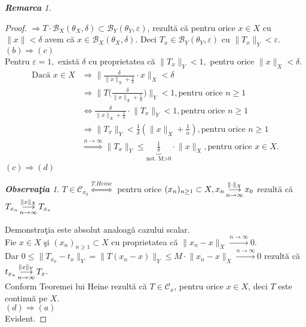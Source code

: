\documentclass[ a4paper, 12pt]{report}
\theoremstyle{definition}
\theoremstyle{remark}
\newtheorem{remarc}{\bf Remarca}[section]
\newtheorem{obs}{\bf Observa\c tia }[section]
\numberwithin{equation}{section}
\begin{document}
\begin{remarc}
\begin{proof}
$\Rightarrow T \cdot \mathcal{B}_{X}(\theta_{X}, \delta) \subset \mathcal{B}_{Y}(\theta_{Y}, \varepsilon)$, rezult\u a c\u a pentru orice $x \in X$ cu $\lVert x \rVert < \delta$ avem c\u a $x \in \mathcal{B}_{X}(\theta_{X}, \delta)$. Deci $T_{x} \in \mathcal{B}_{Y}(\theta_{Y}, \varepsilon)$ cu $\lVert T_{x} \rVert_{Y}< \varepsilon.$\\
$(b) \Longrightarrow (c)$\\
Pentru $\varepsilon =1,$ exist\u a $\delta$ cu proprietatea c\u a $\lVert T_x \rVert_{Y}<1,$ pentru orice $\lVert x \rVert_{X} < \delta.$\\
\begin{align*}
\mbox{Dac\u a } x \in X &\Rightarrow \lVert \frac{\delta}{\lVert x \rVert_{X}+\frac{1}{n}}\cdot x \rVert_{X} < \delta \\&\Rightarrow \lVert T \Big(  \frac{\delta}{\lVert x \rVert_{X}+\frac{1}{n}} \Big) \rVert_{Y} < 1, \mbox{pentru orice } n \geq 1 \\&\Leftrightarrow \frac{\delta}{\lVert x \rVert_{X}+\frac{1}{n}} \cdot \lVert T_x \rVert_{Y} < 1, \mbox{pentru orice } n \geq 1 \\&\Rightarrow \lVert T_x \rVert_{Y} < \frac{1}{\delta} \left( \lVert x \rVert_{X} + \frac{1}{n} \right), \mbox{pentru orice } n \geq 1 \\&\stackrel{n \rightarrow \infty}{\Longrightarrow} \lVert T_x \rVert_{Y} \leq \underbrace{\frac{1}{\delta}}_\text{not. M>0}  \cdot \lVert x \rVert_{X}, \mbox{pentru orice } x \in X.
\end{align*}
$(c) \Longrightarrow (d)$\\
\begin{obs}
$T \in \mathcal{C}_{x_{0}} \stackrel{T. Heine}{\Longleftrightarrow}$ pentru orice $(x_n)_{n \geq 1} \subset X, x_n \pound\limits_{n \rightarrow \infty}^{\lVert \cdot \rVert_{X}} x_0$ rezult\u a c\u a $T_{x_{n}} \pound\limits_{n \rightarrow \infty}^{\lVert x \rVert_{X}} T_{x_{o}}$
\end{obs}
Demonstra\c tia este absolut analoag\u a cazului scalar.\\
Fie $x \in X$ \c si $(x_n)_{n \geq 1} \subset X$ cu proprietatea c\u a  $\lVert x_n - x \rVert_{X} \stackrel{n \rightarrow \infty}{\longrightarrow} 0.$\\
Dar $0 \leq \lVert T_{x_{n}} - t_x \rVert_{Y} = \lVert T(x_n - x) \rVert_{Y} \leq M \cdot \lVert x_n - x \rVert_{X} \stackrel{n \rightarrow \infty}{\longrightarrow}0$ rezult\u a c\u a  $t_{x_{n}} \pound\limits_{n \rightarrow \infty}^{\lVert x \rVert_{Y}} T_x.$\\
Conform Teoremei lui Heine rezult\u a c\u a $T \in \mathcal{C}_{x}$, pentru orice $x \in X$, deci $T$ este continu\u a pe $X$.\\
$(d)\Longrightarrow (a)$\\
Evident.
\end{proof}
\end{remarc}
\end{document}
